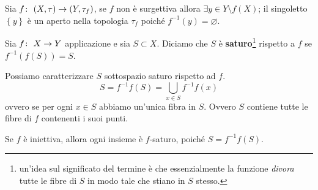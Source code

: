 \begin{remark}
	Sia $f \colon\ (X, \tau) \rightarrow (Y, \tau_f)$, se $f$ non è surgettiva allora $\exists y \in Y \setminus f(X)$; il singoletto $\left\{y\right\}$ è un aperto nella topologia $\tau_f$ poiché $f^{-1}(y) = \varnothing$.
\end{remark} 

\begin{definition}
	Sia $f \colon\ X \rightarrow Y$ applicazione e sia $S \subset X$. Diciamo che $S$ è \textbf{saturo}\footnote{un'idea sul significato del termine è che essenzialmente la funzione \textit{divora} tutte le fibre di $S$ in modo tale che stiano in $S$ stesso.} rispetto a $f$ se $f^{-1}(f(S)) = S$.
\end{definition} 

\begin{remark}
	Possiamo caratterizzare $S$ sottospazio saturo rispetto ad $f$.
	\begin{equation*}
		S = f^{-1}f(S) = \bigcup_{x \in S} f^{-1}f(x)
	\end{equation*}
	ovvero se per ogni $x \in S$ abbiamo un'unica fibra in $S$. Ovvero $S$ contiene tutte le fibre di $f$ contenenti i suoi punti. 
\end{remark} 

\begin{remark}
	Se $f$ è iniettiva, allora ogni insieme è $f$-saturo, poiché $S = f^{-1}f(S)$.
\end{remark}

